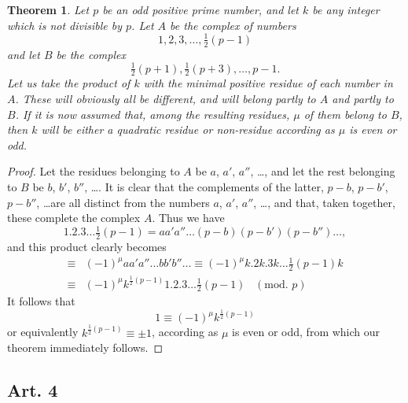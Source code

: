 \documentclass{book}
\theoremstyle{plain}
\newtheorem*{theorem}{Theorem}
\theoremstyle{remark}
\begin{document}
\begin{theorem} Let $p$ be an odd positive prime number, and let $k$ be any integer which is not divisible by $p$.  Let $A$ be the complex of numbers 
\[ 1, 2, 3, \dots, \tfrac{1}{2}(p-1) \]
and let $B$ be the complex 
\[ \tfrac{1}{2}(p+1), \tfrac{1}{2}(p+3),\dots, p-1. \]
Let us take the product of $k$ with the minimal positive residue of each number in $A$.  These will obviously all be different, and will belong partly to $A$ and partly to $B$.  If it is now assumed that, among the resulting residues, $\mu$ of them belong to $B$, then $k$ will be either a quadratic residue or non-residue according as $\mu$ is even or odd.\end{theorem}
\begin{proof} Let the residues belonging to $A$ be $a$, $a'$, $a''$, \dots, and let the rest belonging to $B$ be $b$, $b'$, $b''$, \dots.  It is clear that the complements of the latter, $p-b$, $p-b'$, $p-b''$, \dots are all distinct from the numbers $a$, $a'$, $a''$, \dots, and that, taken together, these complete the complex $A$.  Thus we have 
\[ 1.2.3\dots\tfrac{1}{2}(p-1) = a a' a'' \dots (p-b)(p-b')(p-b'') \dots, \]
and this product clearly becomes
\begin{align*} \equiv& (-1)^{\mu} aa'a''\dots b b' b'' \dots \equiv (-1)^\mu k . 2k .3k\dots \tfrac{1}{2}(p-1)k \\
\equiv& (-1)^\mu k^{\frac{1}{2}(p-1)} 1 . 2 . 3 \dots \tfrac{1}{2}(p-1) \; \;\;(\textrm{mod. }p)  \end{align*}
It follows that 
\[ 1 \equiv (-1)^{\mu} k^{\frac{1}{2}(p-1)} \]
or equivalently $k^{\frac{1}{2}(p-1)} \equiv \pm 1$, according as $\mu$ is even or odd, from which our theorem immediately follows.
\end{proof}

\subsection*{Art. 4} 
\end{document}
